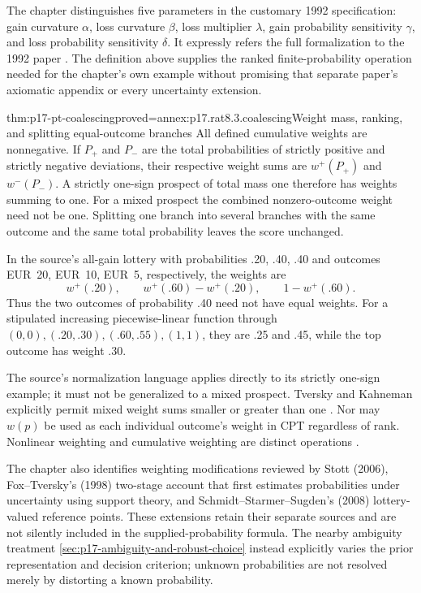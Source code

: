 The chapter distinguishes five parameters in the customary 1992
specification: gain curvature \(\alpha\), loss curvature \(\beta\),
loss multiplier \(\lambda\), gain probability sensitivity
\(\gamma\), and loss probability sensitivity \(\delta\).
It expressly refers the full formalization to the 1992 paper
\cite[p.~488]{Glockner2021ProspectTheory}. The definition above
supplies the ranked finite-probability operation needed for the
chapter's own example without promising that separate paper's
axiomatic appendix or every uncertainty extension.

\begin{hbtheorem}{thm:p17-pt-coalescing}{proved=annex:p17.rat8.3.coalescing}{Weight mass, ranking, and splitting equal-outcome branches}
All defined cumulative weights are nonnegative. If \(P_+\) and
\(P_-\) are the total probabilities of strictly positive and
strictly negative deviations, their respective weight sums are
\(w^+(P_+)\) and \(w^-(P_-)\). A strictly one-sign prospect
of total mass one therefore has weights summing to one. For a
mixed prospect the combined nonzero-outcome weight need not be one.
Splitting one branch into several branches with the same outcome
and the same total probability leaves the score unchanged.

In the source's all-gain lottery with probabilities .20, .40, .40
and outcomes EUR~20, EUR~10, EUR~5, respectively, the weights are
\[
 w^+(.20),\qquad w^+(.60)-w^+(.20),\qquad 1-w^+(.60).
\]
Thus the two outcomes of probability .40 need not have equal
weights. For a stipulated increasing piecewise-linear function
through \((0,0),(.20,.30),(.60,.55),(1,1)\), they are .25 and
.45, while the top outcome has weight .30.
\end{hbtheorem}

The source's normalization language applies directly to its strictly
one-sign example; it must not be generalized to a mixed prospect.
Tversky and Kahneman explicitly permit mixed weight sums smaller
or greater than one \cite[p.~301]{TverskyKahneman1992Cumulative}.
Nor may \(w(p)\) be used as each individual outcome's weight in
CPT regardless of rank. Nonlinear weighting and cumulative weighting
are distinct operations \cite[note~4, p.~492]{Glockner2021ProspectTheory}.

The chapter also identifies weighting modifications reviewed by
Stott (2006), Fox--Tversky's (1998) two-stage account that first
estimates probabilities under uncertainty using support theory,
and Schmidt--Starmer--Sugden's (2008) lottery-valued reference points. These
extensions retain their separate sources and are not silently included
in the supplied-probability formula. The nearby ambiguity treatment
\cref{sec:p17-ambiguity-and-robust-choice} instead explicitly varies
the prior representation and decision criterion; unknown probabilities
are not resolved merely by distorting a known probability.

